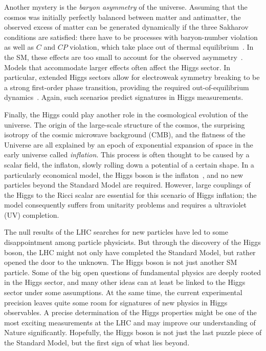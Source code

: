 Another mystery is the \emph{baryon asymmetry} of the
universe. Assuming that the cosmos was initially perfectly balanced
between matter and antimatter, the observed excess of matter can be
generated dynamically if the three Sakharov conditions are satisfied:
there have to be processes with baryon-number violation as well as $C$
and $CP$ violation, which take place out of thermal
equilibrium~\cite{Sakharov:1967dj}. In the SM, these effects are too
small to account for the observed asymmetry~\cite{Kobayashi:1973fv,
  Kuzmin:1985mm, Kajantie:1996mn, Rubakov:1996vz}. Models that
accommodate larger effects often affect the Higgs sector. In
particular, extended Higgs sectors allow for electroweak symmetry
breaking to be a strong first-order phase transition, providing the
required out-of-equilibrium dynamics~\cite{McLerran:1990zh,
  Turok:1990zg, Cohen:1991iu}. Again, such scenarios predict
signatures in Higgs measurements.

Finally, the Higgs could play another role in the cosmological
evolution of the universe. The origin of the large-scale structure of
the cosmos, the surprising isotropy of the cosmic microwave background
(CMB), and the flatness of the Universe are all explained by an epoch
of exponential expansion of space in the early universe called
\emph{inflation}. This process is often thought to be caused by a
scalar field, the inflaton, slowly rolling down a potential of a
certain shape. In a particularly economical model, the Higgs boson is
the inflaton~\cite{Bezrukov:2007ep}, and no new particles beyond the
Standard Model are required. However, large couplings of the Higgs to
the Ricci scalar are essential for this scenario of Higgs inflation;
the model consequently suffers from unitarity problems and requires a
ultraviolet (UV) completion.

\newparagraph
%
The null results of the LHC searches for new particles have led to
some disappointment among particle physicists. But through the
discovery of the Higgs boson, the LHC might not only have completed
the Standard Model, but rather opened the door to the unknown. The
Higgs boson is not just another SM particle. Some of the big open
questions of fundamental physics are deeply rooted in the Higgs
sector, and many other ideas can at least be linked to the Higgs
sector under some assumptions. At the same time, the current
experimental precision leaves quite some room for signatures of new
physics in Higgs observables. A precise determination of the Higgs
properties might be one of the most exciting measurements at the LHC
and may improve our understanding of Nature significantly. Hopefully,
the Higgs boson is not just the last puzzle piece of the Standard
Model, but the first sign of what lies beyond.



